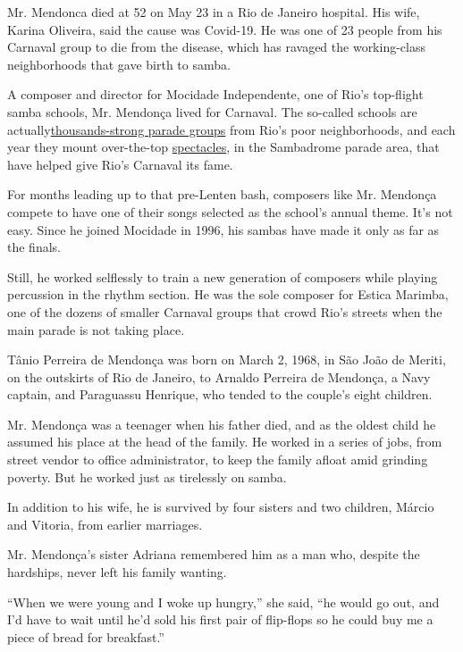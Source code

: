 Mr. Mendonca died at 52 on May 23 in a Rio de Janeiro hospital. His
wife, Karina Oliveira, said the cause was Covid-19. He was one of 23
people from his Carnaval group to die from the disease, which has
ravaged the working-class neighborhoods that gave birth to samba.

A composer and director for Mocidade Independente, one of Rio's
top-flight samba schools, Mr. Mendonça lived for Carnaval. The so-called
schools are
actually\href{https://www.theatlantic.com/photo/2020/02/brazil-carnival-2020-photos/607075/}{thousands-strong
parade groups} from Rio's poor neighborhoods, and each year they mount
over-the-top
\href{https://www.youtube.com/watch?v=9ztLCSwg6k0}{spectacles}, in the
Sambadrome parade area, that have helped give Rio's Carnaval its fame.

For months leading up to that pre-Lenten bash, composers like Mr.
Mendonça compete to have one of their songs selected as the school's
annual theme. It's not easy. Since he joined Mocidade in 1996, his
sambas have made it only as far as the finals.

Still, he worked selflessly to train a new generation of composers while
playing percussion in the rhythm section. He was the sole composer for
Estica Marimba, one of the dozens of smaller Carnaval groups that crowd
Rio's streets when the main parade is not taking place.

Tânio Perreira de Mendonça was born on March 2, 1968, in São João de
Meriti, on the outskirts of Rio de Janeiro, to Arnaldo Perreira de
Mendonça, a Navy captain, and Paraguassu Henrique, who tended to the
couple's eight children.

Mr. Mendonça was a teenager when his father died, and as the oldest
child he assumed his place at the head of the family. He worked in a
series of jobs, from street vendor to office administrator, to keep the
family afloat amid grinding poverty. But he worked just as tirelessly on
samba.

In addition to his wife, he is survived by four sisters and two
children, Márcio and Vitoria, from earlier marriages.

Mr. Mendonça's sister Adriana remembered him as a man who, despite the
hardships, never left his family wanting.

``When we were young and I woke up hungry,'' she said, ``he would go
out, and I'd have to wait until he'd sold his first pair of flip-flops
so he could buy me a piece of bread for breakfast.''

\href{https://www.nytimes3xbfgragh.onion/interactive/2020/obituaries/people-died-coronavirus-obituaries.html?action=click\&pgtype=Article\&state=default\&region=BELOW_MAIN_CONTENT\&context=covid_obits_promo}{}

